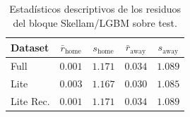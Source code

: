 \begin{table}[htbp]
    \centering
    \caption{Estad\'isticos descriptivos de los residuos del bloque Skellam/LGBM sobre test.}
    \label{tab:skellam_resid}
        \begin{tabular}{lcccc}
        \toprule
        \textbf{Dataset} & $\bar{r}_{\text{home}}$ & $s_{\text{home}}$ & $\bar{r}_{\text{away}}$ & $s_{\text{away}}$ \\
        \midrule
        Full & $0.001$ & $1.171$ & $0.034$ & $1.089$ \\
        Lite & $0.003$ & $1.167$ & $0.030$ & $1.085$ \\
        Lite Rec. & $0.001$ & $1.171$ & $0.034$ & $1.089$ \\
        \bottomrule
    \end{tabular}
\end{table}